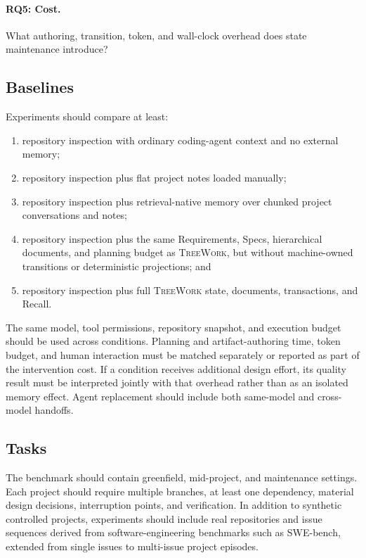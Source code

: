 \documentclass[11pt]{article}
\newcommand{\system}{\textsc{TreeWork}\xspace}
\theoremstyle{definition}
\begin{document}
\paragraph{RQ5: Cost.}
What authoring, transition, token, and wall-clock overhead does state
maintenance introduce?

\subsection{Baselines}

Experiments should compare at least:

\begin{enumerate}
  \item repository inspection with ordinary coding-agent context and no
        external memory;
  \item repository inspection plus flat project notes loaded manually;
  \item repository inspection plus retrieval-native memory over chunked project
        conversations and notes;
  \item repository inspection plus the same Requirements, Specs, hierarchical
        documents, and planning budget as \system, but without machine-owned
        transitions or deterministic projections; and
  \item repository inspection plus full \system state, documents, transactions,
        and Recall.
\end{enumerate}

The same model, tool permissions, repository snapshot, and execution budget
should be used across conditions.  Planning and artifact-authoring time, token
budget, and human interaction must be matched separately or reported as part of
the intervention cost.  If a condition receives additional design effort, its
quality result must be interpreted jointly with that overhead rather than as an
isolated memory effect.  Agent replacement should include both same-model and
cross-model handoffs.

\subsection{Tasks}

The benchmark should contain greenfield, mid-project, and maintenance settings.
Each project should require multiple branches, at least one dependency,
material design decisions, interruption points, and verification.  In addition
to synthetic controlled projects, experiments should include real repositories
and issue sequences derived from software-engineering benchmarks such as
SWE-bench, extended from single issues to multi-issue project episodes.
\end{document}

